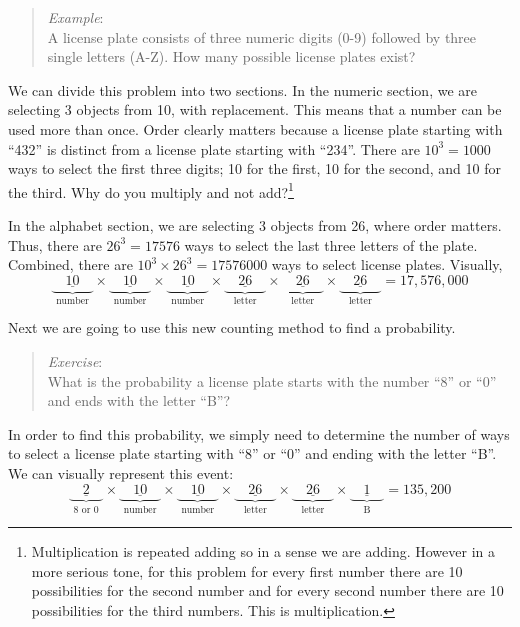 \documentclass[
]{book}
\begin{document}
\begin{quote}
\emph{Example}:\\
A license plate consists of three numeric digits (0-9) followed by three single letters (A-Z). How many possible license plates exist?
\end{quote}

We can divide this problem into two sections. In the numeric section, we are selecting 3 objects from 10, with replacement. This means that a number can be used more than once. Order clearly matters because a license plate starting with ``432'' is distinct from a license plate starting with ``234''. There are \(10^3 = 1000\) ways to select the first three digits; 10 for the first, 10 for the second, and 10 for the third. Why do you multiply and not add?\footnote{Multiplication is repeated adding so in a sense we are adding. However in a more serious tone, for this problem for every first number there are 10 possibilities for the second number and for every second number there are 10 possibilities for the third numbers. This is multiplication.}

In the alphabet section, we are selecting 3 objects from 26, where order matters. Thus, there are \(26^3=17576\) ways to select the last three letters of the plate. Combined, there are \(10^3 \times 26^3 = 17576000\) ways to select license plates. Visually,
\[
\underbrace{\underline{\quad 10 \quad }}_\text{number} \times \underbrace{\underline{\quad 10 \quad }}_\text{number} \times \underbrace{\underline{\quad 10 \quad }}_\text{number} \times \underbrace{\underline{\quad 26 \quad }}_\text{letter} \times \underbrace{\underline{\quad 26 \quad }}_\text{letter} \times \underbrace{\underline{\quad 26 \quad }}_\text{letter} = 17,576,000
\]

Next we are going to use this new counting method to find a probability.

\begin{quote}
\emph{Exercise}:\\
What is the probability a license plate starts with the number ``8'' or ``0'' and ends with the letter ``B''?
\end{quote}

In order to find this probability, we simply need to determine the number of ways to select a license plate starting with ``8'' or ``0'' and ending with the letter ``B''. We can visually represent this event:
\[
\underbrace{\underline{\quad 2 \quad }}_\text{8 or 0} \times \underbrace{\underline{\quad 10 \quad }}_\text{number} \times \underbrace{\underline{\quad 10 \quad }}_\text{number} \times \underbrace{\underline{\quad 26 \quad }}_\text{letter} \times \underbrace{\underline{\quad 26 \quad }}_\text{letter} \times \underbrace{\underline{\quad 1 \quad }}_\text{B} = 135,200
\]
\end{document}
